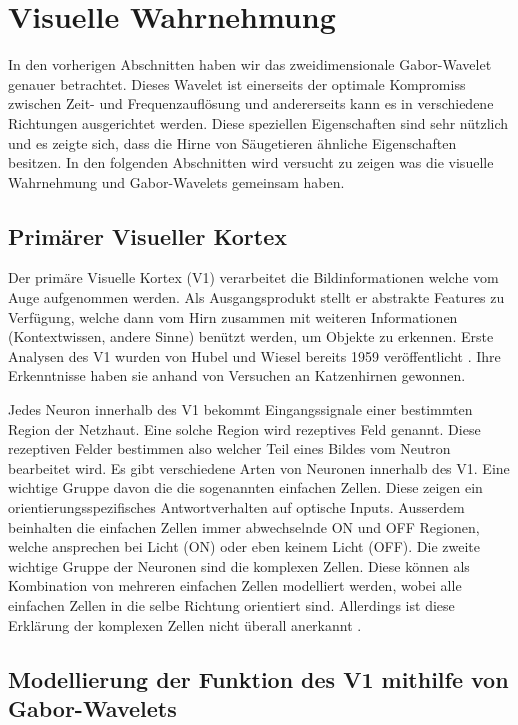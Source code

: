 \section{Visuelle Wahrnehmung}

In den vorherigen Abschnitten haben wir das zweidimensionale Gabor-Wavelet genauer betrachtet.
Dieses Wavelet ist einerseits der optimale Kompromiss zwischen Zeit- und Frequenzauflösung und andererseits kann es in verschiedene Richtungen ausgerichtet werden.
Diese speziellen Eigenschaften sind sehr nützlich und es zeigte sich, dass die Hirne von Säugetieren ähnliche Eigenschaften besitzen.
In den folgenden Abschnitten wird versucht zu zeigen was die visuelle Wahrnehmung und Gabor-Wavelets gemeinsam haben. 

\subsection{Primärer Visueller Kortex}

Der primäre Visuelle Kortex (V1) verarbeitet die Bildinformationen welche vom Auge aufgenommen werden.
Als Ausgangsprodukt stellt er abstrakte Features zu Verfügung, welche dann vom Hirn zusammen mit weiteren Informationen (Kontextwissen, andere Sinne)  benützt werden, um Objekte zu erkennen.
Erste Analysen des V1 wurden von Hubel und Wiesel bereits 1959 veröffentlicht \cite{paper:hubelwiesel}.
Ihre Erkenntnisse haben sie anhand von Versuchen an Katzenhirnen gewonnen.

Jedes Neuron innerhalb des V1 bekommt Eingangssignale einer bestimmten Region der Netzhaut.
Eine solche Region wird rezeptives Feld genannt.
Diese rezeptiven Felder bestimmen also welcher Teil eines Bildes vom Neutron bearbeitet wird.
Es gibt verschiedene Arten von Neuronen innerhalb des V1.
Eine wichtige Gruppe davon die die sogenannten einfachen Zellen.
Diese zeigen ein orientierungsspezifisches Antwortverhalten auf optische Inputs.
Ausserdem beinhalten die einfachen Zellen immer abwechselnde ON und OFF Regionen, welche ansprechen bei Licht (ON) oder eben keinem Licht (OFF).
Die zweite wichtige Gruppe der Neuronen sind die komplexen Zellen.
Diese können als Kombination von mehreren einfachen Zellen modelliert werden, wobei alle einfachen Zellen in die selbe Richtung orientiert sind.
Allerdings ist diese Erklärung der komplexen Zellen nicht überall anerkannt \cite{book:neuroscience}.


\subsection{Modellierung der Funktion des V1 mithilfe von Gabor-Wavelets}

